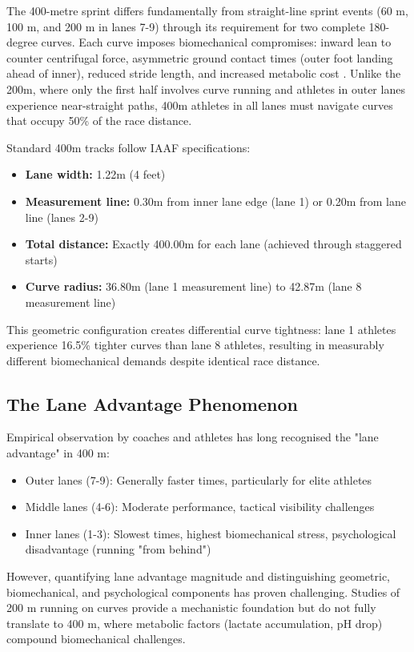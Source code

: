 \documentclass[12pt]{article}
\begin{document}
The 400-metre sprint differs fundamentally from straight-line sprint events (60 m, 100 m, and 200 m in lanes 7-9) through its requirement for two complete 180-degree curves. Each curve imposes biomechanical compromises: inward lean to counter centrifugal force, asymmetric ground contact times (outer foot landing ahead of inner), reduced stride length, and increased metabolic cost \citep{Churchill2015, Quinn2009}. Unlike the 200m, where only the first half involves curve running and athletes in outer lanes experience near-straight paths, 400m athletes in all lanes must navigate curves that occupy 50\% of the race distance.

Standard 400m tracks follow IAAF specifications:
\begin{itemize}
    \item \textbf{Lane width:} 1.22m (4 feet)
    \item \textbf{Measurement line:} 0.30m from inner lane edge (lane 1) or 0.20m from lane line (lanes 2-9)
    \item \textbf{Total distance:} Exactly 400.00m for each lane (achieved through staggered starts)
    \item \textbf{Curve radius:} 36.80m (lane 1 measurement line) to 42.87m (lane 8 measurement line)
\end{itemize}

This geometric configuration creates differential curve tightness: lane 1 athletes experience 16.5\% tighter curves than lane 8 athletes, resulting in measurably different biomechanical demands despite identical race distance.

\subsection{The Lane Advantage Phenomenon}

Empirical observation by coaches and athletes has long recognised the "lane advantage" in 400 m:
\begin{itemize}
    \item Outer lanes (7-9): Generally faster times, particularly for elite athletes
    \item Middle lanes (4-6): Moderate performance, tactical visibility challenges
    \item Inner lanes (1-3): Slowest times, highest biomechanical stress, psychological disadvantage (running "from behind")
\end{itemize}

However, quantifying lane advantage magnitude and distinguishing geometric, biomechanical, and psychological components has proven challenging. Studies of 200 m running on curves \citep{Churchill2015, Quinn2009} provide a mechanistic foundation but do not fully translate to 400 m, where metabolic factors (lactate accumulation, pH drop) compound biomechanical challenges.
\end{document}
